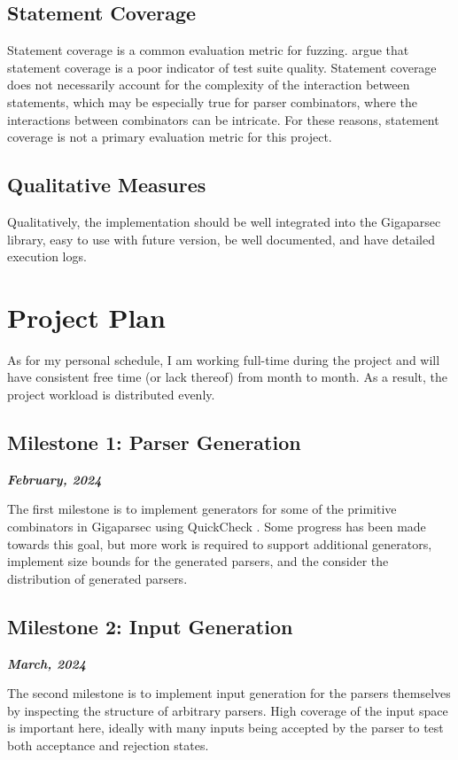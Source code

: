 \documentclass{article}
\let\oldciteauthor\citeauthor
\renewcommand{\citeauthor}[1]{\oldciteauthor{#1} \cite{#1}}
\newcommand{\be}[1]{\textbf{\emph{#1}}}
\begin{document}
\subsection{Statement Coverage}

Statement coverage is a common evaluation metric for fuzzing. \citeauthor{coverage} argue that statement coverage is a poor indicator of test suite quality. Statement coverage does not necessarily account for the complexity of the interaction between statements, which may be especially true for parser combinators, where the interactions between combinators can be intricate. For these reasons, statement coverage is not a primary evaluation metric for this project.

\subsection{Qualitative Measures}

Qualitatively, the implementation should be well integrated into the Gigaparsec library, easy to use with future version, be well documented, and have detailed execution logs.

\section{Project Plan} %

As for my personal schedule, I am working full-time during the project and will have consistent free time (or lack thereof) from month to month. As a result, the project workload is distributed evenly.

\subsection{Milestone 1: Parser Generation}
\be{February, 2024}

The first milestone is to implement generators for some of the primitive combinators in Gigaparsec using QuickCheck \cite{quickcheck}. Some progress has been made towards this goal, but more work is required to support additional generators, implement size bounds for the generated parsers, and the consider the distribution of generated parsers.

\subsection{Milestone 2: Input Generation}
\be{March, 2024}

The second milestone is to implement input generation for the parsers themselves by inspecting the structure of arbitrary parsers. High coverage of the input space is important here, ideally with many inputs being accepted by the parser to test both acceptance and rejection states.
\end{document}
